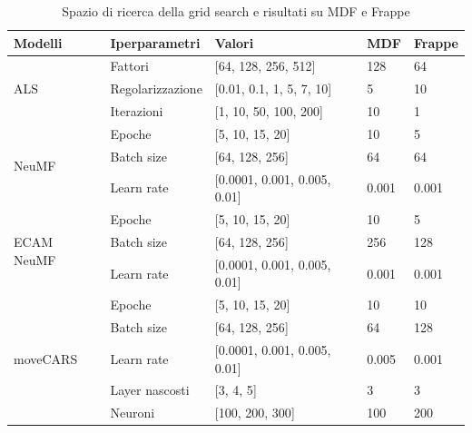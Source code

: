 \documentclass[12pt,italian]{report}
\begin{document}
\begin{table}[]
\centering
\begin{tabular}{@{}lllll@{}}
\toprule
\textbf{Modelli}                     & \textbf{Iperparametri}  & \textbf{Valori}       & \textbf{MDF} & \textbf{Frappe}                    \\ \midrule 
\multirow{3}{*}[-11pt]{ALS}        & Fattori        & {[}64, 128, 256, 512{]} & 128 & 64          \\ \addlinespace[1em]
                            & Regolarizzazione & {[}0.01, 0.1, 1, 5, 7, 10{]}  & 5 & 10  \\  \addlinespace[1em]
                            & Iterazioni      & {[}1, 10, 50, 100, 200{]}   & 10  & 1   \\  \midrule 
                            
\multirow{3}{*}[-12pt]{NeuMF}      & Epoche         & {[}5, 10, 15, 20{]}  & 10 & 5           \\ \addlinespace[1em]
                            & Batch size     & {[}64, 128, 256{]}          & 64  & 64    \\ \addlinespace[1em]
                            & Learn rate     & {[}0.0001, 0.001, 0.005, 0.01{]} & 0.001 & 0.001 \\  \midrule 
                            
\multirow{3}{*}[-12pt]{ECAM NeuMF} & Epoche         & {[}5, 10, 15, 20{]}    & 10  & 5        \\ \addlinespace[1em]
                            & Batch size     & {[}64, 128, 256{]} & 256    & 128           \\ \addlinespace[1em]
                            & Learn rate     & {[}0.0001, 0.001, 0.005, 0.01{]} & 0.001 & 0.001\\   \midrule 
                            
\multirow{5}{*}[-24pt]{moveCARS}   & Epoche         & {[}5, 10, 15, 20{]} & 10  & 10             \\ \addlinespace[1em]
                            & Batch size     & {[}64, 128, 256{]} & 64 & 128        \\  \addlinespace[1em]
                            & Learn rate     & {[}0.0001, 0.001, 0.005, 0.01{]} & 0.005 & 0.001 \\    \addlinespace[1em]
                            & Layer nascosti        & {[}3, 4, 5{]} & 3 & 3                    \\ \addlinespace[1em]
                            & Neuroni        & {[}100, 200, 300{]} & 100 & 200\\           \midrule
\end{tabular}
\caption{\label{tab:grid-search}Spazio di ricerca della grid search e risultati su MDF e Frappe}
\end{table}
\end{document}
